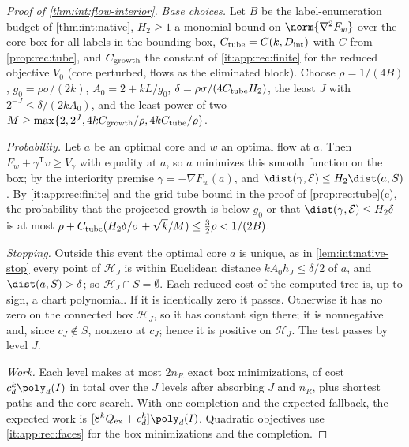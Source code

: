 \begin{proof}[Proof of \cref{thm:int:flow-interior}]
\emph{Base choices.} Let $B$ be the label-enumeration budget of
\cref{thm:int:native}, $H_2\ge1$ a monomial bound on $\norm{\nabla^2F_w}$ over the
core box for all labels in the bounding box, $C_{\rm tube}=C(k,D_{\rm int})$ with
$C$ from \cref{prop:rec:tube}, and $C_{\rm growth}$ the constant of
\ref{it:app:rec:finite} for the reduced objective $V_0$ (core perturbed, flows as
the eliminated block). Choose $\rho=1/(4B)$, $g_0=\rho\sigma/(2k)$,
$A_0=2+kL/g_0$, $\delta=\rho\sigma/(4C_{\rm tube}H_2)$, the least $J$ with
$2^{-J}\le\delta/(2kA_0)$, and the least power of two
$M\ge\max\{2,2^J,4kC_{\rm growth}/\rho,4kC_{\rm tube}/\rho\}$.

\emph{Probability.} Let $a$ be an optimal core and $w$ an optimal flow at $a$. Then
$F_w+\gamma^{\mathsf T}v\ge V_\gamma$ with equality at $a$, so $a$ minimizes this
smooth function on the box; by the interiority premise $\gamma=-\nabla F_w(a)$, and
$\dist(\gamma,\mathcal E)\le H_2\dist(a,S)$. By \ref{it:app:rec:finite} and the
grid tube bound in the proof of \cref{prop:rec:tube}(c), the probability that the
projected growth is below $g_0$ or that $\dist(\gamma,\mathcal E)\le H_2\delta$ is at
most $\rho+C_{\rm tube}(H_2\delta/\sigma+\sqrt k/M)\le\frac32\rho<1/(2B)$.

\emph{Stopping.} Outside this event the optimal core $a$ is unique, as in
\cref{lem:int:native-stop} every point of $\mathcal H_J$ is within Euclidean distance
$kA_0h_J\le\delta/2$ of $a$, and $\dist(a,S)>\delta$; so $\mathcal H_J\cap S=\emptyset$.
Each reduced cost of the computed tree is, up to sign, a chart polynomial. If it is
identically zero it passes. Otherwise it has no zero on the connected box
$\mathcal H_J$, so it has constant sign there; it is nonnegative and, since
$c_J\notin S$, nonzero at $c_J$; hence it is positive on $\mathcal H_J$. The test
passes by level $J$.

\emph{Work.} Each level makes at most $2n_R$ exact box minimizations, of cost
$c_d^k\poly_d(I)$ in total over the $J$ levels after absorbing $J$ and $n_R$, plus
shortest paths and the core search. With one completion and the expected fallback,
the expected work is $[8^kQ_{\rm ex}+c_d^k]\poly_d(I)$. Quadratic objectives use
\ref{it:app:rec:faces} for the box minimizations and the completion.
\end{proof}

